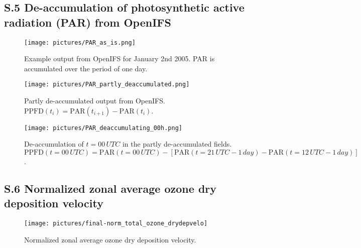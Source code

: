\documentclass[manuscript]{copernicus}
\begin{document}
\subsection*{S.5 De-accumulation of photosynthetic active radiation (PAR) from OpenIFS}
\begin{figure}[!htbp]
  \centering
  \texttt{[image: pictures/PAR\_as\_is.png]}
  \caption{Example output from OpenIFS for January 2nd 2005. PAR is accumulated over the period of one day.}
\end{figure}

\begin{figure}[!htbp]
  \centering
  \texttt{[image: pictures/PAR\_partly\_deaccumulated.png]}
  \caption{Partly de-accumulated output from OpenIFS. $\text{PPFD}(t_i) = \text{PAR}(t_{i+1})-\text{PAR}(t_i)$.}
\end{figure}

\begin{figure}[!htbp]
  \centering
  \texttt{[image: pictures/PAR\_deaccumulating\_00h.png]}
  \caption{De-accumulation of $t=00\,\unit{UTC}$ in the partly de-accumulated fields. $\text{PPFD}(t=00\,\unit{UTC}) = \text{PAR}(t=00\,\unit{UTC}) - \left[\text{PAR}(t=21\,\unit{UTC}-1\,\unit{day})-\text{PAR}(t=12\,\unit{UTC}-1\,\unit{day})\right]$.}
\end{figure}

\subsection*{S.6 Normalized zonal average ozone dry deposition velocity}
\begin{figure}[!htbp]
  \centering
  \texttt{[image: pictures/final-norm\_total\_ozone\_drydepvelo]}
  \caption{Normalized zonal average ozone dry deposition velocity.}
\end{figure}
\end{document}
